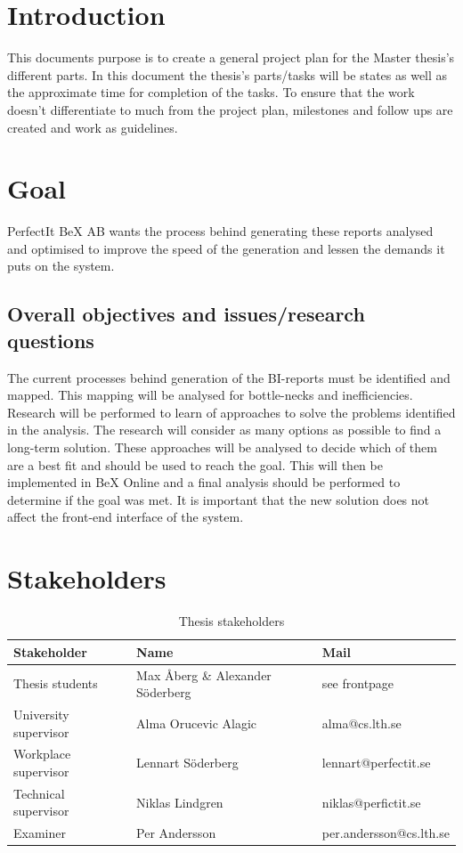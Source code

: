 \documentclass[12pt,a4paper]{article}
\begin{document}
\newpage

\vspace*{-2\baselineskip}

\section*{Introduction}
This documents purpose is to create a general project plan for the Master thesis's different parts. In this document the thesis's parts/tasks will be states as well as the approximate time for completion of the tasks. To ensure that the work doesn't differentiate to much from the project plan, milestones and follow ups are created and work as guidelines.

\section*{Goal}
PerfectIt BeX AB wants the process behind generating these reports analysed and optimised to improve the speed of the generation and lessen the demands it puts on the system.
\subsection*{Overall objectives and issues/research questions}
The current processes behind generation of the BI-reports must be identified and mapped. This mapping will be analysed for bottle-necks and inefficiencies. Research will be performed to learn of approaches to solve the problems identified in the analysis. The research will consider as many options as possible to find a long-term solution.
These approaches will be analysed to decide which of them are a best fit and should be used to reach the goal. This will then be implemented in BeX Online and a final analysis should be performed to determine if the goal was met.
It is important that the new solution does not affect the front-end interface of the system.

\section*{Stakeholders}
\begin{table}[H]
    \begin{tabular}{l|l|l}
    Stakeholder & Name & Mail \\\hline
    Thesis students & Max Åberg \& Alexander Söderberg & see frontpage \\\hline
    University supervisor & Alma Orucevic Alagic & alma@cs.lth.se\\\hline
    Workplace supervisor & Lennart Söderberg & lennart@perfectit.se\\\hline
    Technical supervisor & Niklas Lindgren & niklas@perfictit.se\\\hline
    Examiner & Per Andersson & per.andersson@cs.lth.se 
    \end{tabular}
    \caption{Thesis stakeholders}
\end{table}
\end{document}
